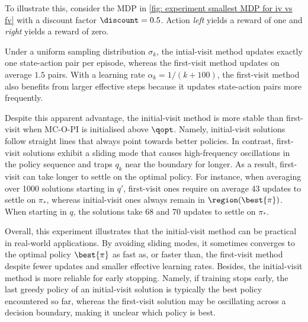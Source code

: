 To illustrate this, consider the MDP in \autoref{fig: experiment smallest MDP for iv vs fv} with a discount factor $\discount = 0.5$. Action \textit{left} yields a reward of one and \textit{right} yields a reward of zero.


Under a uniform sampling distribution $\sigma_k$, the intial-visit method updates exactly one state-action pair per episode, whereas the first-visit method updates on average $1.5$ pairs.
With a learning rate $\alpha_k = 1/(k+100)$, the first-visit method also benefits from larger effective steps because it updates state-action pairs more frequently.



Despite this apparent advantage, the initial-visit method is more stable than first-visit when MC-O-PI is initialised above $\qopt$.
Namely, initial-visit solutions follow straight lines that always point towards better policies.
In contrast, first-visit solutions exhibit a sliding mode that causes high-frequency oscillations in the policy sequence and traps $q_k$ near the boundary for longer.
As a result, first-visit can take longer to settle on the optimal policy.
For instance, when averaging over 1000 solutions starting in $q'$, first-visit ones require on average 43 updates to settle on $\pi_*$, whereas initial-visit ones always remain in $\region(\best{\pi})$.
When starting in $q$, the solutions take 68 and 70 updates to settle on $\pi_*$.


Overall, this experiment illustrates that the initial-visit method can be practical in real-world applications. 
By avoiding sliding modes, it sometimes converges to the optimal policy $\best{\pi}$ as fast as, or faster than, the first-visit method despite fewer updates and smaller effective learning rates.
Besides, the initial-visit method is more reliable for early stopping. Namely, if training stops early, the last greedy policy of an initial-visit solution is typically the best policy encountered so far, whereas the first-visit solution may be oscillating across a decision boundary, making it unclear which policy is best.
















